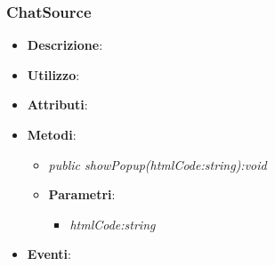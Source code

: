\subsubsection{ChatSource}
\begin{itemize}
\item \textbf{Descrizione}: 
\item \textbf{Utilizzo}:
\item \textbf{Attributi}: 
\item \textbf{Metodi}:
	\begin{itemize}
	\item \textit{public showPopup(htmlCode:string):void}\\
	
			\item{\textbf{Parametri}: \begin{itemize}
			\item \textit{htmlCode:string}\\

			\end{itemize}}
	\end{itemize}
\item \textbf{Eventi}:
\end{itemize}

